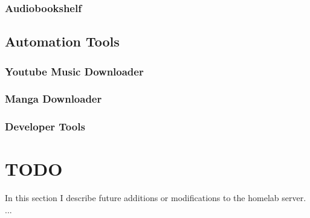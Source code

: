 \documentclass{article}
\begin{document}
\subsubsection{Audiobookshelf}


\subsection{Automation Tools}
\subsubsection{Youtube Music Downloader}

\subsubsection{Manga Downloader}

\subsubsection{Developer Tools}


\section{TODO}
In this section I describe future additions or modifications to the homelab server.
...
\end{document}
